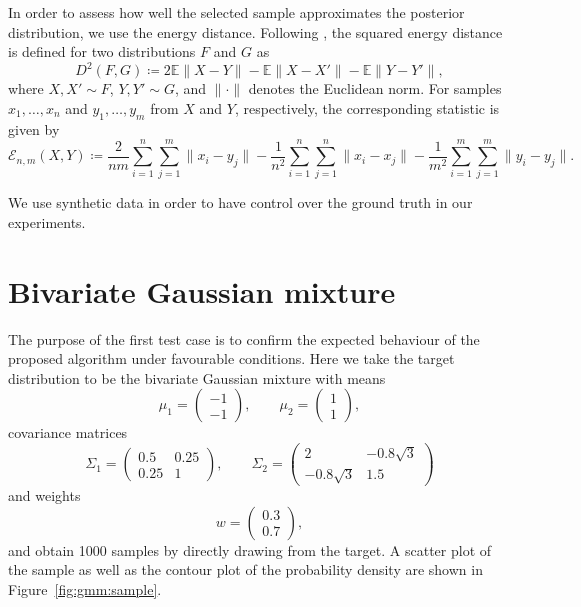 \documentclass[11pt,a4paper]{report}
\begin{document}
In order to assess how well the selected sample approximates the posterior distribution, we use the energy distance. Following \cite{rizzoEnergyDistance2016}, the squared energy distance is defined for two distributions $F$ and $G$ as
$$D^2(F, G) \coloneq 2 \mathbb{E} \|X - Y\| - \mathbb{E}\|X - X'\| - \mathbb{E} \|Y - Y'\|,$$
where $X, X' \sim F$, $Y, Y' \sim G$, and $\|\cdot\|$ denotes the Euclidean norm. For samples $x_1, \dots, x_n$ and $y_1, \dots, y_m$ from $X$ and $Y$, respectively, the corresponding statistic is given by
\begin{equation*}
\mathcal{E}_{n,m}(X, Y) \coloneq \frac{2}{nm}\sum_{i=1}^n \sum_{j=1}^m \|x_i - y_j\| - \frac{1}{n^2} \sum_{i=1}^n\sum_{j=1}^n \|x_i - x_j\| - \frac{1}{m^2} \sum_{i=1}^m \sum_{j=1}^m \|y_i - y_j\|.
\label{eq:energy-distance:discrete}
\end{equation*}


We use synthetic data in order to have control over the ground truth in our experiments.

\section{Bivariate Gaussian mixture}
\label{sec:gaussian-mixture}

The purpose of the first test case is to confirm the expected behaviour of the proposed algorithm under favourable conditions. Here we take the target distribution to be the bivariate Gaussian mixture with means 
$$
\mu_1 = \begin{pmatrix} -1 \\ -1 \end{pmatrix}, \qquad
\mu_2 = \begin{pmatrix} 1 \\ 1 \end{pmatrix},
$$
covariance matrices
$$
\Sigma_1 = \begin{pmatrix}
0.5 & 0.25\\
0.25 & 1
\end{pmatrix}, \qquad
\Sigma_2 = \begin{pmatrix}
2 & -0.8 \sqrt{3}\\
-0.8 \sqrt{3} & 1.5
\end{pmatrix}
$$
and weights
$$w = \begin{pmatrix} 0.3 \\ 0.7 \end{pmatrix},$$
and obtain 1000 samples by directly drawing from the target. A scatter plot of the sample as well as the contour plot of the probability density are shown in Figure~\ref{fig:gmm:sample}.
\end{document}
